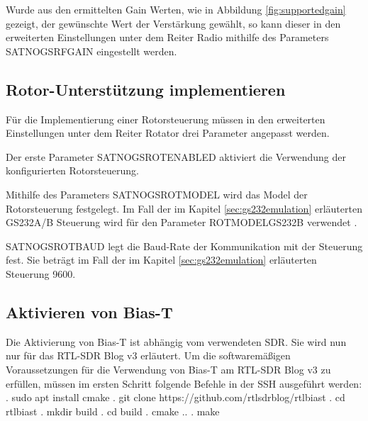 Wurde aus den ermittelten Gain Werten, wie in Abbildung \ref{fig:supportedgain} gezeigt, der gewünschte Wert der Verstärkung gewählt, so kann dieser in den erweiterten Einstellungen unter dem Reiter \glqq Radio\grqq{} mithilfe des Parameters \glqq SATNOGS\textunderscore RF\textunderscore GAIN\grqq{} eingestellt werden. 

\subsection{Rotor-Unterstützung implementieren}
Für die Implementierung einer Rotorsteuerung müssen in den erweiterten Einstellungen unter dem Reiter \glqq Rotator\grqq{} drei Parameter angepasst werden. 

Der erste Parameter \glqq{}SATNOGS\textunderscore ROT\textunderscore ENABLED\grqq{} aktiviert die Verwendung der konfigurierten Rotorsteuerung. 

Mithilfe des Parameters \glqq SATNOGS\textunderscore ROT\textunderscore MODEL\grqq{} wird das Model der Rotorsteuerung festgelegt. Im Fall der im Kapitel \ref{sec:gs232emulation} erläuterten GS232A/B Steuerung wird für den Parameter \glqq ROT\textunderscore MODEL\textunderscore GS232B\grqq{} verwendet \cite{noauthor_satnogsclient_nodate}. 

\glqq SATNOGS\textunderscore ROT\textunderscore BAUD\grqq{} legt die Baud-Rate der Kommunikation mit der Steuerung fest. Sie beträgt im Fall der im Kapitel \ref{sec:gs232emulation} erläuterten Steuerung 9600.

\subsection{Aktivieren von Bias-T}
Die Aktivierung von Bias-T ist abhängig vom verwendeten SDR. Sie wird nun nur für das RTL-SDR Blog v3 erläutert. Um die softwaremäßigen Voraussetzungen für die Verwendung von Bias-T am RTL-SDR Blog v3 zu erfüllen, müssen im ersten Schritt folgende Befehle in der SSH ausgeführt werden:
. \glqq sudo apt install cmake\grqq{}
. \glqq git clone https://github.com/rtlsdrblog/rtl\textunderscore biast\grqq{}
. \glqq cd rtl\textunderscore biast\grqq{}
. \glqq mkdir build\grqq{}
. \glqq cd build\grqq{}
. \glqq cmake ..\grqq{}
. \glqq make\grqq{}

